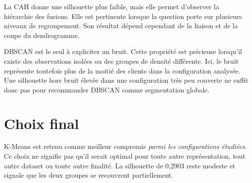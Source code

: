 La CAH donne une silhouette plus faible, mais elle permet d'observer la hiérarchie des fusions. Elle est pertinente lorsque la question porte sur plusieurs niveaux de regroupement. Son résultat dépend cependant de la liaison et de la coupe du dendrogramme.

DBSCAN est le seul à expliciter un bruit. Cette propriété est précieuse lorsqu'il existe des observations isolées ou des groupes de densité différente. Ici, le bruit représente toutefois plus de la moitié des clients dans la configuration analysée. Une silhouette hors bruit élevée dans une configuration très peu couverte ne suffit donc pas pour recommander DBSCAN comme segmentation globale.

\section{Choix final}
K-Means est retenu comme meilleur compromis \emph{parmi les configurations étudiées}. Ce choix ne signifie pas qu'il serait optimal pour toute autre représentation, tout autre dataset ou toute autre finalité. La silhouette de 0,2903 reste modeste et signale que les deux groupes se recouvrent partiellement.
